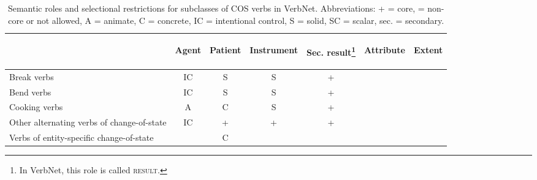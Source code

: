 \begin{table} []
    \caption[Semantic roles and selectional restrictions for subclasses of COS verbs in VerbNet]{\label{tab:cosnet} Semantic roles and selectional restrictions for subclasses of COS verbs in VerbNet. Abbreviations: 
      + = core,
      \textendash{} = non-core or not allowed,
      A = animate, 
      C = concrete, 
      IC = intentional control, 
      S = solid, 
      SC = scalar,
      sec. = secondary.} 
    \begin{tabular}{lcccccc}
      \lsptoprule
      & \begin{sideways} Agent \end{sideways}
      & \begin{sideways} Patient \end{sideways}
      & \begin{sideways} Instrument \end{sideways}
      & \begin{sideways} Sec. result\footnote{In VerbNet, this role is called \textsc{result}.} \end{sideways}
      & \begin{sideways} Attribute \end{sideways}
      & \begin{sideways} Extent \end{sideways}
      \\ 
      \midrule
      Break verbs 
            & IC
            & S
            & S
            & +
            & \textendash{}
            & \textendash{} \\ 
            
            Bend verbs
            & IC
            & S
            & S 
            & +
            & \textendash{}
            & \textendash{} \\
            
            Cooking verbs 
            & A
            & C
            & S
            & +
            & \textendash{}
            & \textendash{} \\
            
            Other alternating verbs of change-of-state 
            & IC
            & + 
            & +
            & +
            & \textendash{}
            & \textendash{} \\
            
            Verbs of entity-specific change-of-state
            & \textendash{}
            & C
            & \textendash{}
            & \textendash{}
            & \textendash{}
            & \textendash{} \\
            

\end{tabular}
\end{table}
